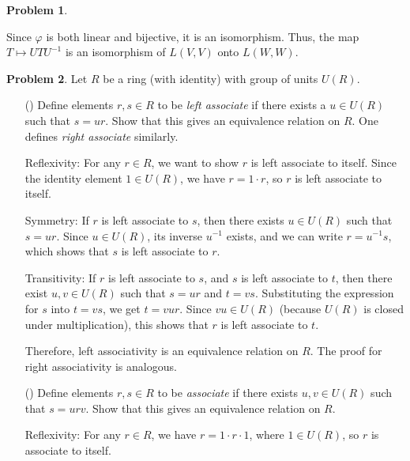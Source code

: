 \documentclass[12pt]{article}
\theoremstyle{definition}
\newtheorem{problem}{Problem}
\newcounter{subq}[problem]
\newenvironment{subproblem}
{\refstepcounter{subq} \begin{itemize} \item[(\alph{subq})]}
{\end{itemize} \medskip}
\begin{document}
\begin{problem}
\begin{solution}
        Since \( \varphi \) is both linear and bijective, it is an isomorphism. Thus, the map \( T \mapsto UTU^{-1} \) is an isomorphism of \( L(V, V) \) onto \( L(W, W) \).
    \end{solution}
\end{problem}

\begin{problem}
    Let $R$ be a ring (with identity) with group of units $U(R)$.

    \begin{subproblem}
        Define elements $r, s \in R$ to be \textit{left associate} if there exists a $u \in U(R)$ such
        that $s = ur$. Show that this gives an equivalence relation on $R$. One defines \textit{right associate} similarly.
        
        \begin{solution}        
            Reflexivity: For any \( r \in R \), we want to show \( r \) is left associate to itself. Since the identity element \( 1 \in U(R) \), we have \( r = 1 \cdot r \), so \( r \) is left associate to itself.
            
            Symmetry: If \( r \) is left associate to \( s \), then there exists \( u \in U(R) \) such that \( s = ur \). Since \( u \in U(R) \), its inverse \( u^{-1} \) exists, and we can write \( r = u^{-1}s \), which shows that \( s \) is left associate to \( r \).
            
            Transitivity: If \( r \) is left associate to \( s \), and \( s \) is left associate to \( t \), then there exist \( u, v \in U(R) \) such that \( s = ur \) and \( t = vs \). Substituting the expression for \( s \) into \( t = vs \), we get \( t = vur \). Since \( vu \in U(R) \) (because \( U(R) \) is closed under multiplication), this shows that \( r \) is left associate to \( t \).

            Therefore, left associativity is an equivalence relation on \( R \). The proof for right associativity is analogous.
        \end{solution}
    \end{subproblem}
    \begin{subproblem}
        Define elements $r, s \in R$ to be \textit{associate} if there exists $u, v \in U(R)$ such that $s = urv$. Show that
        this gives an equivalence relation on $R$.

        \begin{solution}        
            Reflexivity: For any \( r \in R \), we have \( r = 1 \cdot r \cdot 1 \), where \( 1 \in U(R) \), so \( r \) is associate to itself.
            

\end{solution}
\end{subproblem}
\end{problem}
\end{document}
